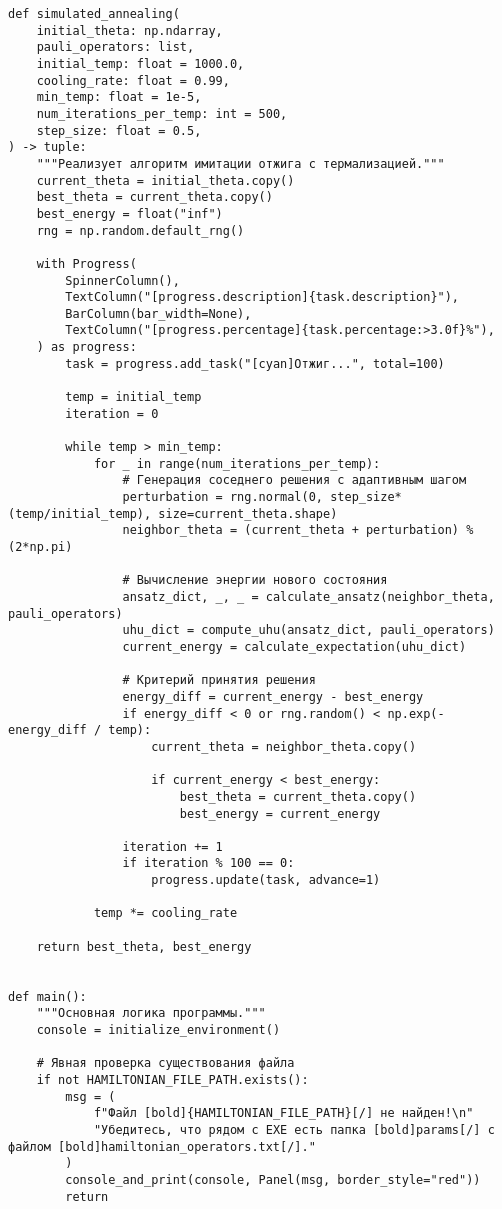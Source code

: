 \documentclass[a4paper]{report}
\begin{document}
\begin{lstlisting}
def simulated_annealing(
    initial_theta: np.ndarray,
    pauli_operators: list,
    initial_temp: float = 1000.0,
    cooling_rate: float = 0.99,
    min_temp: float = 1e-5,
    num_iterations_per_temp: int = 500,
    step_size: float = 0.5,
) -> tuple:
    """Реализует алгоритм имитации отжига с термализацией."""
    current_theta = initial_theta.copy()
    best_theta = current_theta.copy()
    best_energy = float("inf")
    rng = np.random.default_rng()

    with Progress(
        SpinnerColumn(),
        TextColumn("[progress.description]{task.description}"),
        BarColumn(bar_width=None),
        TextColumn("[progress.percentage]{task.percentage:>3.0f}%"),
    ) as progress:
        task = progress.add_task("[cyan]Отжиг...", total=100)

        temp = initial_temp
        iteration = 0

        while temp > min_temp:
            for _ in range(num_iterations_per_temp):
                # Генерация соседнего решения с адаптивным шагом
                perturbation = rng.normal(0, step_size*(temp/initial_temp), size=current_theta.shape)
                neighbor_theta = (current_theta + perturbation) % (2*np.pi)

                # Вычисление энергии нового состояния
                ansatz_dict, _, _ = calculate_ansatz(neighbor_theta, pauli_operators)
                uhu_dict = compute_uhu(ansatz_dict, pauli_operators)
                current_energy = calculate_expectation(uhu_dict)

                # Критерий принятия решения
                energy_diff = current_energy - best_energy
                if energy_diff < 0 or rng.random() < np.exp(-energy_diff / temp):
                    current_theta = neighbor_theta.copy()

                    if current_energy < best_energy:
                        best_theta = current_theta.copy()
                        best_energy = current_energy

                iteration += 1
                if iteration % 100 == 0:
                    progress.update(task, advance=1)

            temp *= cooling_rate

    return best_theta, best_energy


def main():
    """Основная логика программы."""
    console = initialize_environment()

    # Явная проверка существования файла
    if not HAMILTONIAN_FILE_PATH.exists():
        msg = (
            f"Файл [bold]{HAMILTONIAN_FILE_PATH}[/] не найден!\n"
            "Убедитесь, что рядом с EXE есть папка [bold]params[/] с файлом [bold]hamiltonian_operators.txt[/]."
        )
        console_and_print(console, Panel(msg, border_style="red"))
        return


\end{lstlisting}
\end{document}
